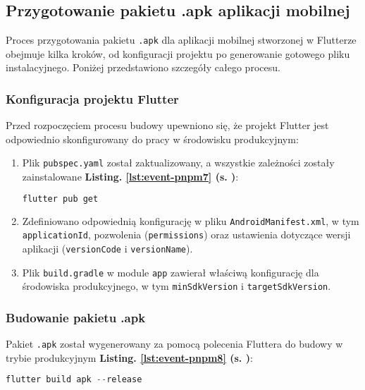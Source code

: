 \subsection{Przygotowanie pakietu .apk aplikacji mobilnej}

Proces przygotowania pakietu \texttt{.apk} dla aplikacji mobilnej stworzonej w Flutterze obejmuje kilka kroków, od konfiguracji projektu po generowanie gotowego pliku instalacyjnego. Poniżej przedstawiono szczegóły całego procesu.

\subsubsection{Konfiguracja projektu Flutter}

Przed rozpoczęciem procesu budowy upewniono się, że projekt Flutter jest odpowiednio skonfigurowany do pracy w środowisku produkcyjnym:
\begin{enumerate}
  \item Plik \texttt{pubspec.yaml} został zaktualizowany, a wszystkie zależności zostały zainstalowane \textbf{Listing. \ref{lst:event-pnpm7} (s. \pageref{lst:event-pnpm7})}:
        \begin{lstlisting}[language=C++, caption=Pobranie pakietów w flutterze,  label={lst:event-pnpm7}]
    flutter pub get
    \end{lstlisting}
  \item Zdefiniowano odpowiednią konfigurację w pliku \texttt{AndroidManifest.xml}, w tym \texttt{applicationId}, pozwolenia (\texttt{permissions}) oraz ustawienia dotyczące wersji aplikacji (\texttt{versionCode} i \texttt{versionName}).
  \item Plik \texttt{build.gradle} w module \texttt{app} zawierał właściwą konfigurację dla środowiska produkcyjnego, w tym \texttt{minSdkVersion} i \texttt{targetSdkVersion}.
\end{enumerate}

\subsubsection{Budowanie pakietu .apk}

Pakiet \texttt{.apk} został wygenerowany za pomocą polecenia Fluttera do budowy w trybie produkcyjnym \textbf{Listing. \ref{lst:event-pnpm8} (s. \pageref{lst:event-pnpm8})}:
\begin{lstlisting}[language=C++, caption=Budowa oficjalnego pakietu .apk,  label={lst:event-pnpm8}]
flutter build apk --release
\end{lstlisting}

